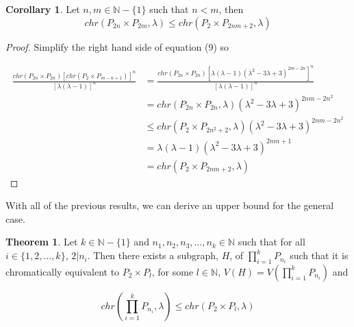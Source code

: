 \documentclass[11pt]{article}
\theoremstyle{definition}
\newcommand{\N}{{\mathbb{N}}}
\newtheorem{thm}{Theorem}
\newtheorem{cor}{Corollary}
\begin{document}
\begin{cor}
Let $n,m \in \N - \{1\}$ such that $n < m$, then
\begin{equation}
chr(P_{2n} \times P_{2m}, \lambda) \leq chr(P_{2} \times P_{2nm + 2}, \lambda) \nonumber
\end{equation}
\end{cor}

\begin{proof}
Simplify the right hand side of equation (9) so

\begin{align*}
\frac{chr(P_{2n} \times P_{2n})[chr(P_{2} \times P_{m - n + 1})]^n}{[\lambda(\lambda - 1)]^n} &= \frac{chr(P_{2n} \times P_{2n})[\lambda(\lambda - 1)(\lambda^2 -3\lambda + 3)^{2m - 2n}]^n}{[\lambda(\lambda - 1)]^n} \\
&= chr(P_{2n} \times P_{2n}, \lambda)(\lambda^2 - 3\lambda + 3)^{2nm - 2n^2} \\
&\leq chr(P_{2} \times P_{2n^2 + 2},\lambda)(\lambda^2 -3\lambda + 3)^{2nm - 2n^2} \\
&= \lambda(\lambda - 1)(\lambda^2 - 3\lambda + 3)^{2nm + 1} \\
&= chr(P_{2} \times P_{2nm + 2}, \lambda)
\end{align*}
\end{proof}

With all of the previous results, we can derive an upper bound for the general case.

\begin{thm}
Let $k \in \N - \{1\}$ and $n_1, n_2, n_3, \ldots, n_k \in \N$ such that for all $i \in \{1, 2, \ldots, k\}$, $2 | n_i$. Then there exists a subgraph, $H$, of $\prod_{i = 1}^{k}P_{n_{i}}$ such that it is chromatically equivalent to $P_2 \times P_l$, for some $l \in \N$, $V(H) = V(\prod_{i = 1}^{k}P_{n_{i}})$ and

\begin{equation}
chr(\prod_{i = 1}^{k}P_{n_{i}}, \lambda) \leq chr(P_{2} \times P_{l}, \lambda)
\end{equation}
\end{thm}
\end{document}
